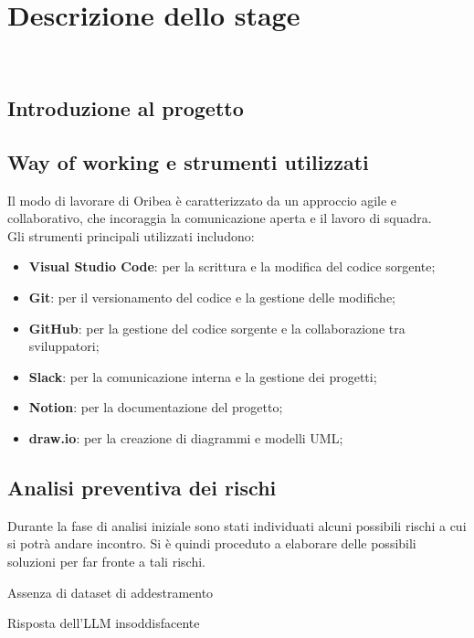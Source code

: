 \chapter{Descrizione dello stage}
\label{cap:descrizione-stage}

\\

\section{Introduzione al progetto}


\section{Way of working e strumenti utilizzati}
\label{sec:way-of-working}

Il modo di lavorare di Oribea è caratterizzato da un approccio agile e collaborativo, che incoraggia la comunicazione aperta e il lavoro di squadra.\\

Gli strumenti principali utilizzati includono:
\begin{itemize}
    \item \textbf{Visual Studio Code}: per la scrittura e la modifica del codice sorgente;
    \item \textbf{Git}: per il versionamento del codice e la gestione delle modifiche;
    \item \textbf{GitHub}: per la gestione del codice sorgente e la collaborazione tra sviluppatori;
    \item \textbf{Slack}: per la comunicazione interna e la gestione dei progetti;
    \item \textbf{Notion}: per la documentazione del progetto;
    \item \textbf{draw.io}: per la creazione di diagrammi e modelli UML; 
\end{itemize}

\section{Analisi preventiva dei rischi}

Durante la fase di analisi iniziale sono stati individuati alcuni possibili rischi a cui si potrà andare incontro.
Si è quindi proceduto a elaborare delle possibili soluzioni per far fronte a tali rischi.\\

\begin{risk}{Assenza di dataset di addestramento}
    \label{risk:dataset-absence} 
\end{risk}

\begin{risk}{Risposta dell'LLM insoddisfacente}
    \label{risk:bad-llm-response} 
\end{risk}
